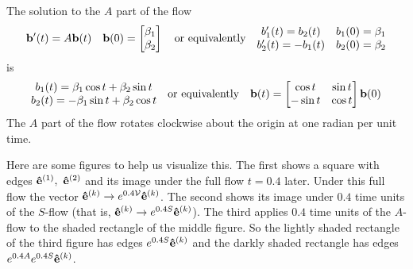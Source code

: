\begin{eg}[$\ \vv(x,y)= 2y\hi.$]
The solution to  the $A$ part of the flow
\begin{equation*}
\mathbf{b}'(t)=A\mathbf{b}(t)\quad 
    \mathbf{b}(0)=\left[\begin{matrix}\beta_1 \\ \beta_2\end{matrix}\right]
\quad\text{or equivalently}\quad
\begin{matrix}b_1'(t)=b_2(t) & b_1(0)=\beta_1\cr
        b_2'(t)=-b_1(t) & b_2(0)=\beta_2\end{matrix}
\end{equation*}
is
\begin{equation*}
\begin{matrix}b_1(t)=\beta_1\cos t+\beta_2\sin t\cr
        b_2(t)=-\beta_1\sin t+\beta_2\cos t\end{matrix}
\quad\text{or equivalently}\quad
\mathbf{b}(t)=\left[
  \begin{matrix}\cos t& \sin t\cr -\sin t&\cos t\end{matrix}\right]\mathbf{b}(0)
\end{equation*}
The $A$ part of the flow rotates clockwise about  the origin at one radian
per unit time.


Here are some figures to help us visualize this. The first shows 
a square with edges $\mathbf{\hat e}^{(1)},\ \mathbf{\hat e}^{(2)}$
and its image under the full flow $t=0.4$ later.  Under this full flow
the vector $\mathbf{\hat e}^{(k)}\rightarrow e^{0.4\mathcal{V}}\mathbf{\hat e}^{(k)}$. The second shows its image 
under $0.4$ time units of the $S$-flow (that is, $\mathbf{\hat e}^{(k)}\rightarrow e^{0.4S}\mathbf{\hat e}^{(k)}$).
 The third applies $0.4$ time units of the $A$-flow to the shaded rectangle
of the middle figure. So the lightly shaded rectangle of the third figure
has edges $e^{0.4S}\mathbf{\hat e}^{(k)}$ and the darkly shaded rectangle 
has edges $e^{0.4A}e^{0.4S}\mathbf{\hat e}^{(k)}$.


\end{eg}
